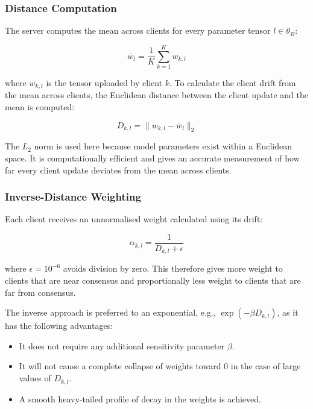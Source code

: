 \documentclass{ieeeaccess}
\begin{document}
\subsubsection{Distance Computation}

The server computes the mean across clients for every parameter tensor $l \in \theta_B$:

\begin{equation}
\label{eq:consensus_mean}
\bar{w}_l = \frac{1}{K} \sum_{k=1}^{K} w_{k,l}
\end{equation}

where $w_{k,l}$ is the tensor uploaded by client $k$. To calculate the client drift from the mean across clients, the Euclidean distance between the client update and the mean is computed:

\begin{equation}
\label{eq:drift_distance}
D_{k,l} = \| w_{k,l} - \bar{w}_l \|_2
\end{equation}

The $L_2$ norm is used here because model parameters exist within a Euclidean space. It is computationally efficient and gives an accurate measurement of how far every client update deviates from the mean across clients.

\subsubsection{Inverse-Distance Weighting}

Each client receives an unnormalised weight calculated using its drift:

\begin{equation}
\label{eq:inv_weight}
\alpha_{k,l} = \frac{1}{D_{k,l} + \epsilon}
\end{equation}

where $\epsilon = 10^{-6}$ avoids division by zero. This therefore gives more weight to clients that are near consensus and proportionally less weight to clients that are far from consensus.

The inverse approach is preferred to an exponential, e.g., $\exp(-\beta D_{k,l})$, as it has the following advantages:
\begin{itemize}
\item It does not require any additional sensitivity parameter $\beta$.
\item It will not cause a complete collapse of weights toward 0 in the case of large values of $D_{k,l}$.
\item A smooth heavy-tailed profile of decay in the weights is achieved.
\end{itemize}
\end{document}
